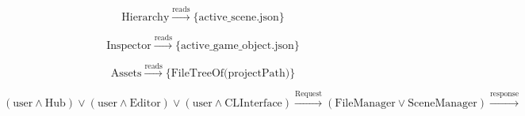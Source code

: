   \[
  \text{Hierarchy} \xrightarrow{\text{reads}} \{\text{active\_scene.json}\}
  \]
  
  \[
  \text{Inspector} \xrightarrow{\text{reads}} \{\text{active\_game\_object.json}\}
  \]
  
  \[
  \text{Assets} \xrightarrow{\text{reads}} \{\text{FileTreeOf(projectPath)}\}
  \]
  
  \[
  (\text{user} \land \text{Hub}) \lor (\text{user} \land \text{Editor}) \lor (\text{user} \land \text{CLInterface}) \xrightarrow{\text{Request}} (\text{FileManager} \lor \text{SceneManager})
  \xrightarrow{\text{response}}
  \]
  














